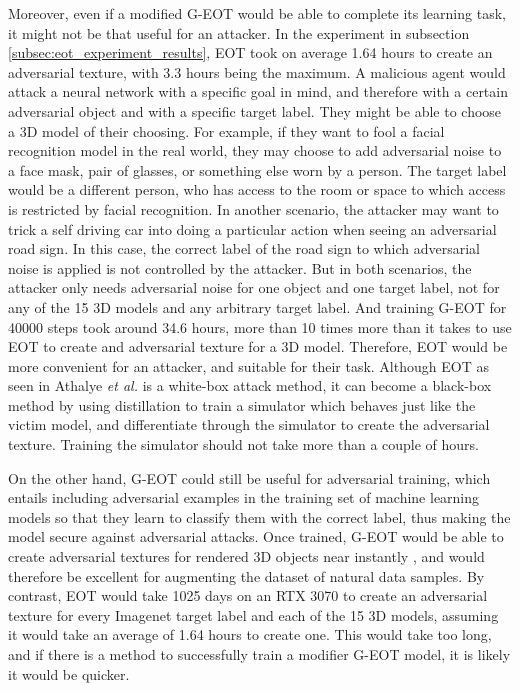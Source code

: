 Moreover, even if a modified G-EOT would be able to complete its learning task, it might not be that useful for an attacker. In the experiment in subsection \ref{subsec:eot_experiment_results}, EOT took on average 1.64 hours to create an adversarial texture, with 3.3 hours being the maximum. A malicious agent would attack a neural network with a specific goal in mind, and therefore with a certain adversarial object and with a specific target label. They might be able to choose a 3D model of their choosing. For example, if they want to fool a facial recognition model in the real world, they may choose to add adversarial noise to a face mask, pair of glasses, or something else worn by a person. The target label would be a different person, who has access to the room or space to which access is restricted by facial recognition. In another scenario, the attacker may want to trick a self driving car into doing a particular action when seeing an adversarial road sign. In this case, the correct label of the road sign to which adversarial noise is applied is not controlled by the attacker. But in both scenarios, the attacker only needs adversarial noise for one object and one target label, not for any of the 15 3D models and any arbitrary target label. And training G-EOT for 40000 steps took around 34.6 hours, more than 10 times more than it takes to use EOT to create and adversarial texture for a 3D model. Therefore, EOT would be more convenient for an attacker, and suitable for their task. Although EOT as seen in Athalye \textit{et al.} \cite{athalye} is a white-box attack method, it can become a black-box method by using distillation \cite{distillation} to train a simulator which behaves just like the victim model, and differentiate through the simulator to create the adversarial texture. Training the simulator should not take more than a couple of hours.

On the other hand, G-EOT could still be useful for adversarial training, which entails including adversarial examples in the training set of machine learning models so that they learn to classify them with the correct label, thus making the model secure against adversarial attacks. Once trained, G-EOT would be able to create adversarial textures for rendered 3D objects near instantly \cite{advGAN}, and would therefore be excellent for augmenting the dataset of natural data samples. By contrast, EOT would take 1025 days on an RTX 3070 to create an adversarial texture for every Imagenet target label and each of the 15 3D models, assuming it would take an average of 1.64 hours to create one. This would take too long, and if there is a method to successfully train a modifier G-EOT model, it is likely it would be quicker.
